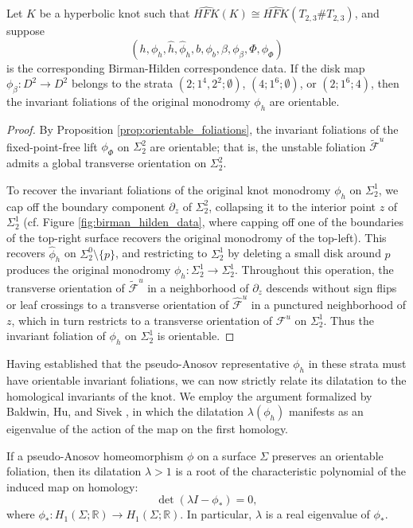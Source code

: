 \begin{corollary}
\label{cor:orientable_knot_monodromy}
    Let $K$ be a hyperbolic knot such that $\widehat{HFK}(K) \cong \widehat{HFK}(T_{2,3} \# T_{2,3})$, and suppose
    \[
    (h, \phi_h, \hat{h}, \hat{\phi}_h, b, \phi_b, \beta, \phi_\beta, \Phi, \phi_\Phi)
    \]
    is the corresponding Birman-Hilden correspondence data. If the disk map $\phi_\beta \colon D^2 \to D^2$ belongs to the strata $(2; 1^4, 2^2; \emptyset)$, $(4; 1^6; \emptyset)$, or $(2; 1^6; 4)$, then the invariant foliations of the original monodromy $\phi_h$ are orientable.
\end{corollary}

\begin{proof}
    By Proposition \ref{prop:orientable_foliations}, the invariant foliations of the fixed-point-free lift $\phi_\Phi$ on $\Sigma_2^2$ are orientable; that is, the unstable foliation $\widetilde{\mathcal{F}}^u$ admits a global transverse orientation on $\Sigma_2^2$.

    To recover the invariant foliations of the original knot monodromy $\phi_h$ on $\Sigma_2^1$, we cap off the boundary component $\partial_z$ of $\Sigma_2^2$, collapsing it to the interior point $z$ of $\Sigma_2^1$ (cf. Figure \ref{fig:birman_hilden_data}, where capping off one of the boundaries of the top-right surface recovers the original monodromy of the top-left). This recovers $\hat{\phi}_h$ on $\Sigma_2^0 \setminus \{p\}$, and restricting to $\Sigma_2^1$ by deleting a small disk around $p$ produces the original monodromy $\phi_h \colon \Sigma_2^1 \to \Sigma_2^1$. Throughout this operation, the transverse orientation of $\widetilde{\mathcal{F}}^u$ in a neighborhood of $\partial_z$ descends without sign flips or leaf crossings to a transverse orientation of $\hat{\mathcal{F}}^u$ in a punctured neighborhood of $z$, which in turn restricts to a transverse orientation of $\mathcal{F}^u$ on $\Sigma_2^1$. Thus the invariant foliation of $\phi_h$ on $\Sigma_2^1$ is orientable.
\end{proof}

Having established that the pseudo-Anosov representative $\phi_h$ in these strata must have orientable invariant foliations, we can now strictly relate its dilatation to the homological invariants of the knot. We employ the argument formalized by Baldwin, Hu, and Sivek \cite{baldwin2025khovanov}, in which the dilatation $\lambda(\phi_h)$ manifests as an eigenvalue of the action of the map on the first homology.

\begin{theorem}
\label{thm:thurston_spectral_radius}
If a pseudo-Anosov homeomorphism $\phi$ on a surface $\Sigma$ preserves an orientable foliation, then its dilatation $\lambda > 1$ is a root of the characteristic polynomial of the induced map on homology:
\begin{equation}
\det(\lambda I - \phi_*) = 0,
\end{equation}
where $\phi_* : H_1(\Sigma; \mathbb{R}) \to H_1(\Sigma; \mathbb{R})$. In particular, $\lambda$ is a real eigenvalue of $\phi_*$.
\end{theorem}

